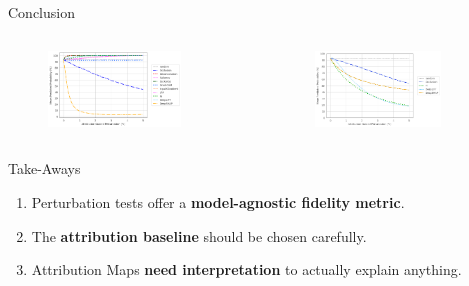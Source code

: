 \documentclass[aspectratio=169,xcolor={table, dvipsnames}]{beamer}
\renewcommand{\emph}[1]{\textbf{#1}}
\begin{document}
\begin{frame}{Conclusion}
	\begin{columns}
		\begin{column}{0.5\textwidth}
			\begin{figure}
				\centering
				\includegraphics[width=0.8\textwidth]{figures/3672-ad-fidelity-null.png}
			\end{figure}
		\end{column}\hfill
		\begin{column}{0.5\textwidth}
			\begin{figure}
				\centering
				\includegraphics[width=0.8\textwidth]{figures/3672-ad-fidelity-cn2.png}
			\end{figure}
		\end{column}
	\end{columns}
	\begin{block}{Take-Aways}
		\begin{enumerate}
			\item<2-> Perturbation tests offer a \emph{model-agnostic fidelity metric}.
			\item<3-> The \emph{attribution baseline} should be chosen carefully.
			\item<4-> Attribution Maps \emph{need interpretation} to actually explain anything.
		\end{enumerate}
	\end{block}

\end{frame}
\end{document}
